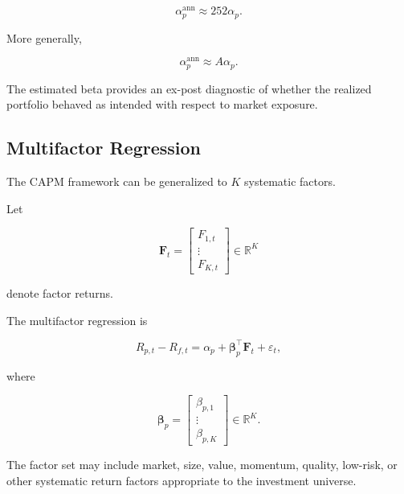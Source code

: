 \documentclass[11pt,a4paper]{article}
\begin{document}
\begin{equation}
\boxed{
\alpha_p^{\mathrm{ann}}
\approx
252\alpha_p.
}
\end{equation}

More generally,

\begin{equation}
\alpha_p^{\mathrm{ann}}
\approx
A\alpha_p.
\end{equation}

The estimated beta provides an ex-post diagnostic of whether the realized
portfolio behaved as intended with respect to market exposure.


\subsection{Multifactor Regression}

The CAPM framework can be generalized to $K$ systematic factors.

Let

\begin{equation}
\mathbf{F}_t
=
\begin{bmatrix}
F_{1,t}\\
\vdots\\
F_{K,t}
\end{bmatrix}
\in
\mathbb{R}^{K}
\end{equation}

denote factor returns.

The multifactor regression is

\begin{equation}
\boxed{
R_{p,t}-R_{f,t}
=
\alpha_p
+
\boldsymbol{\beta}_p^\top
\mathbf{F}_t
+
\varepsilon_t,
}
\end{equation}

where

\begin{equation}
\boldsymbol{\beta}_p
=
\begin{bmatrix}
\beta_{p,1}\\
\vdots\\
\beta_{p,K}
\end{bmatrix}
\in
\mathbb{R}^{K}.
\end{equation}

The factor set may include market, size, value, momentum, quality, low-risk, or
other systematic return factors appropriate to the investment universe.
\end{document}

